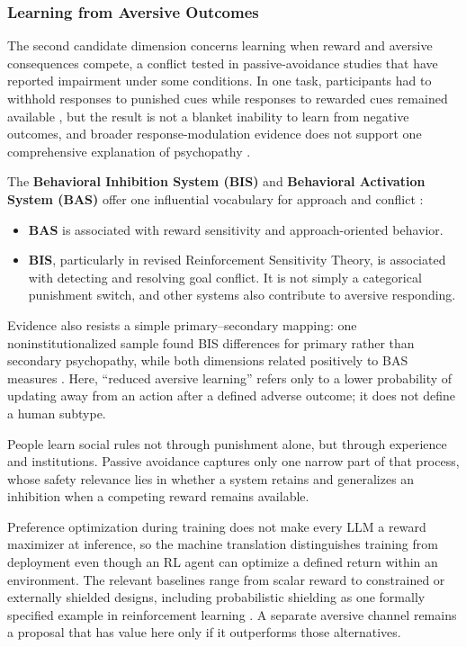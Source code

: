 \documentclass{article}
\begin{document}
\subsubsection{Learning from Aversive Outcomes}
The second candidate dimension concerns learning when reward and aversive consequences compete, a conflict tested in passive-avoidance studies that have reported impairment under some conditions. In one task, participants had to withhold responses to punished cues while responses to rewarded cues remained available \citep{ref54}, but the result is not a blanket inability to learn from negative outcomes, and broader response-modulation evidence does not support one comprehensive explanation of psychopathy \citep{ref55}.

The \textbf{Behavioral Inhibition System (BIS)} and \textbf{Behavioral Activation System (BAS)} offer one influential vocabulary for approach and conflict \citep{ref24, ref61}:
\begin{itemize}
    \item \textbf{BAS} is associated with reward sensitivity and approach-oriented behavior.
    \item \textbf{BIS}, particularly in revised Reinforcement Sensitivity Theory, is associated with detecting and resolving goal conflict. It is not simply a categorical punishment switch, and other systems also contribute to aversive responding.
\end{itemize}
Evidence also resists a simple primary--secondary mapping: one noninstitutionalized sample found BIS differences for primary rather than secondary psychopathy, while both dimensions related positively to BAS measures \citep{ref56}. Here, ``reduced aversive learning'' refers only to a lower probability of updating away from an action after a defined adverse outcome; it does not define a human subtype.

People learn social rules not through punishment alone, but through experience and institutions. Passive avoidance captures only one narrow part of that process, whose safety relevance lies in whether a system retains and generalizes an inhibition when a competing reward remains available.

Preference optimization during training does not make every LLM a reward maximizer at inference, so the machine translation distinguishes training from deployment even though an RL agent can optimize a defined return within an environment. The relevant baselines range from scalar reward to constrained or externally shielded designs, including probabilistic shielding as one formally specified example in reinforcement learning \citep{ref41}. A separate aversive channel remains a proposal that has value here only if it outperforms those alternatives.
\end{document}

